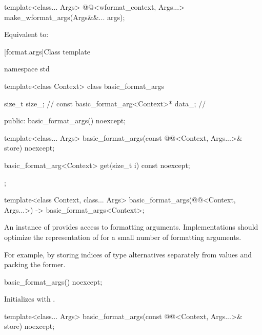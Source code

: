 %
\begin{itemdecl}
template<class... Args>
  @@<wformat_context, Args...> make_wformat_args(Args&&... args);
\end{itemdecl}

\begin{itemdescr}
\pnum
\effects
Equivalent to:
\end{itemdescr}

[format.args]{Class template }

\begin{codeblock}
namespace std {
  template<class Context>
  class basic_format_args {
    size_t size_;                               // \expos
    const basic_format_arg<Context>* data_;     // \expos

  public:
    basic_format_args() noexcept;

    template<class... Args>
      basic_format_args(const @@<Context, Args...>& store) noexcept;

    basic_format_arg<Context> get(size_t i) const noexcept;
  };

  template<class Context, class... Args>
    basic_format_args(@@<Context, Args...>) -> basic_format_args<Context>;
}
\end{codeblock}

\pnum
An instance of  provides access to formatting
arguments.
Implementations should
optimize the representation of 
for a small number of formatting arguments.
\begin{note}
For example, by storing indices of type alternatives separately from values
and packing the former.
\end{note}

%
\begin{itemdecl}
basic_format_args() noexcept;
\end{itemdecl}

\begin{itemdescr}
\pnum
\effects
Initializes  with .
\end{itemdescr}

%
\begin{itemdecl}
template<class... Args>
  basic_format_args(const @@<Context, Args...>& store) noexcept;
\end{itemdecl}

